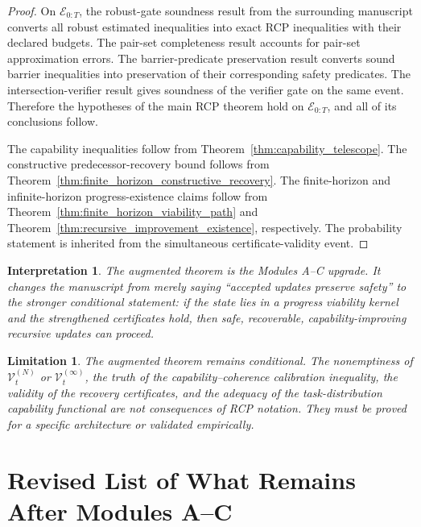 \documentclass[11pt]{article}
\newtheorem{interpretation}[theorem]{Interpretation}
\newtheorem{limitation}[theorem]{Limitation}
\newcommand{\Ecal}{\mathcal{E}}
\newcommand{\1}{\mathbf{1}}
\providecommand{\Vcal}{\mathcal{V}}
\begin{document}
\begin{proof}
On \(\Ecal_{0:T}\), the robust-gate soundness result from the surrounding manuscript converts all robust estimated inequalities into exact RCP inequalities with their declared budgets.  The pair-set completeness result accounts for pair-set approximation errors.  The barrier-predicate preservation result converts sound barrier inequalities into preservation of their corresponding safety predicates.  The intersection-verifier result gives soundness of the verifier gate on the same event.  Therefore the hypotheses of the main RCP theorem hold on \(\Ecal_{0:T}\), and all of its conclusions follow.

The capability inequalities follow from Theorem~\ref{thm:capability_telescope}.  The constructive predecessor-recovery bound follows from Theorem~\ref{thm:finite_horizon_constructive_recovery}.  The finite-horizon and infinite-horizon progress-existence claims follow from Theorem~\ref{thm:finite_horizon_viability_path} and Theorem~\ref{thm:recursive_improvement_existence}, respectively.  The probability statement is inherited from the simultaneous certificate-validity event.
\end{proof}

\begin{interpretation}
The augmented theorem is the Modules A--C upgrade.  It changes the manuscript from merely saying ``accepted updates preserve safety'' to the stronger conditional statement: if the state lies in a progress viability kernel and the strengthened certificates hold, then safe, recoverable, capability-improving recursive updates can proceed.
\end{interpretation}

\begin{limitation}
The augmented theorem remains conditional.  The nonemptiness of \(\Vcal_t^{(N)}\) or \(\Vcal_t^{(\infty)}\), the truth of the capability--coherence calibration inequality, the validity of the recovery certificates, and the adequacy of the task-distribution capability functional are not consequences of RCP notation.  They must be proved for a specific architecture or validated empirically.
\end{limitation}

\section{Revised List of What Remains After Modules A--C}
\label{sec:revised_remaining}
\end{document}
